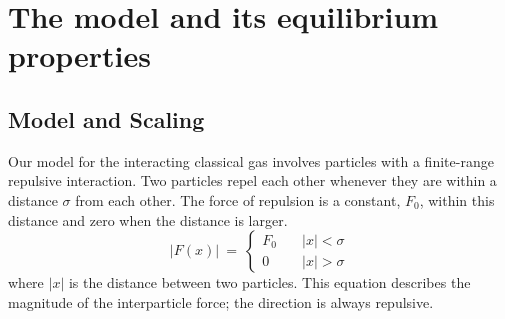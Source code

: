 \documentclass[a4paper, onecolumn]{revtex4-1}
\begin{document}




\section{The model and its equilibrium properties}\label{sec:preparation}

\subsection{Model and Scaling}

Our model for the interacting classical gas involves particles with a finite-range repulsive
interaction.  Two particles repel each other whenever they are within a distance $\sigma$ from each
other.  The force of repulsion is a constant, $F_0$, within this distance and zero when the distance
is larger.
%
\begin{equation}
\Big| F(x) \Big| ~=~ \begin{cases}
F_0  &\quad |x|<\sigma\\
0  &\quad |x|>\sigma
\end{cases}
\label{eq:preparation1}
\end{equation}
where $|x|$ is the distance between two particles.  This equation describes the magnitude of the
interparticle force; the direction is always repulsive.
\end{document}
